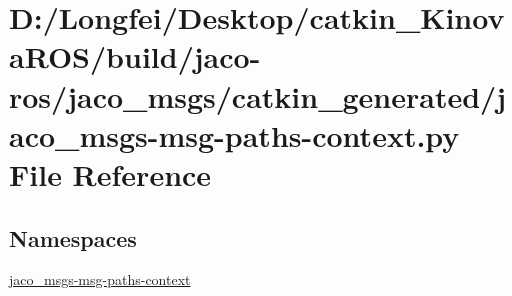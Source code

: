 \hypertarget{jaco__msgs-msg-paths-context_8py}{}\section{D\+:/\+Longfei/\+Desktop/catkin\+\_\+\+Kinova\+R\+O\+S/build/jaco-\/ros/jaco\+\_\+msgs/catkin\+\_\+generated/jaco\+\_\+msgs-\/msg-\/paths-\/context.py File Reference}
\label{jaco__msgs-msg-paths-context_8py}
\subsection*{Namespaces}
\begin{DoxyCompactItemize}
\item 
 \hyperlink{namespacejaco__msgs-msg-paths-context}{jaco\+\_\+msgs-\/msg-\/paths-\/context}
\end{DoxyCompactItemize}
